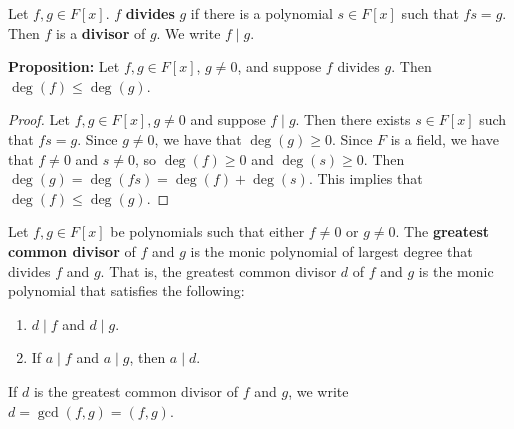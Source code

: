 \documentclass [12pt] {article}
\newenvironment{definition}[1]{\begin{tcolorbox}[title={Definition: #1},colback=blue!5!white,colframe=black!75!blue]}{\end{tcolorbox}}
\renewcommand{\bf}[1]{\textbf{{#1}}}
\begin{document}
\newpage
\begin{definition}{Divides (Polynomials)}
    Let $f, g \in F[x]$. $f$ \bf{divides} $g$ if there is a polynomial $s \in F[x]$ such that
    $fs = g$. Then $f$ is a \bf{divisor} of $g$. We write $f \mid g$.
\end{definition}
\bf{Proposition:} Let $f, g \in F[x]$, $g \neq 0$, and suppose $f$ divides $g$. Then
$\deg(f) \leq \deg(g)$.
\begin{proof}
    Let $f, g \in F[x], g \neq 0$ and suppose $f \mid g$. Then there exists $s \in F[x]$ such that
    $fs = g$. Since $g \neq 0$, we have that $\deg(g) \geq 0$. Since $F$ is a field, we have that
    $f \neq 0$ and $s \neq 0$, so $\deg(f) \geq 0$ and $\deg(s) \geq 0$. Then
    $\deg(g) = \deg(fs) = \deg(f) + \deg(s)$. This implies that $\deg(f) \leq \deg(g)$.
\end{proof}

\begin{definition}{Greatest Common Divisor (gcd) (Polynomials)}
    Let $f, g \in F[x]$ be polynomials such that either $f \neq 0$ or $g \neq 0$. The
    \bf{greatest common divisor} of $f$ and $g$ is the monic polynomial of largest degree that
    divides $f$ and $g$. That is, the greatest common divisor $d$ of $f$ and $g$ is the monic
    polynomial that satisfies the following:
    \begin{enumerate}[label=(\arabic*)]
        \item $d \mid f$ and $d \mid g$.
        \item If $a \mid f$ and $a \mid g$, then $a \mid d$.
    \end{enumerate}
    If $d$ is the greatest common divisor of $f$ and $g$, we write $d = \gcd(f, g) = (f, g)$.
\end{definition}
\end{document}
